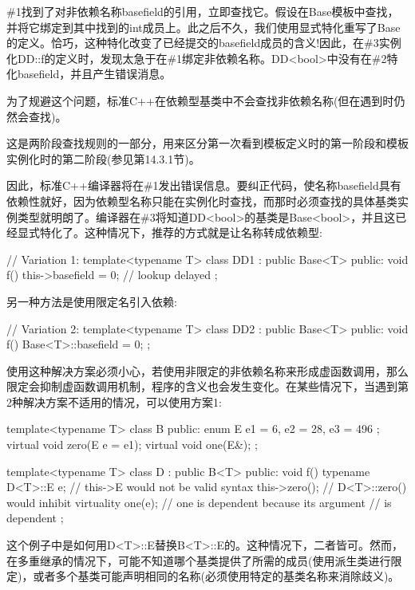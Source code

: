 \#1找到了对非依赖名称basefield的引用，立即查找它。假设在Base模板中查找，并将它绑定到其中找到的int成员上。此之后不久，我们使用显式特化重写了Base的定义。恰巧，这种特化改变了已经提交的basefield成员的含义!因此，在\#3实例化DD::f的定义时，发现太急于在\#1绑定非依赖名称。DD<bool>中没有在\#2特化basefield，并且产生错误消息。

为了规避这个问题，标准C++在依赖型基类中不会查找非依赖名称(但在遇到时仍然会查找)。

\begin{notice}这是两阶段查找规则的一部分，用来区分第一次看到模板定义时的第一阶段和模板实例化时的第二阶段(参见第14.3.1节)。
\end{notice}

因此，标准C++编译器将在\#1发出错误信息。要纠正代码，使名称basefield具有依赖性就好，因为依赖型名称只能在实例化时查找，而那时必须查找的具体基类实例类型就明朗了。编译器在\#3将知道DD<bool>的基类是Base<bool>，并且这已经显式特化了。这种情况下，推荐的方式就是让名称转成依赖型:

\begin{cpp}
// Variation 1:
template<typename T>
class DD1 : public Base<T> {
	public:
	void f() { this->basefield = 0; } // lookup delayed
};
\end{cpp}

另一种方法是使用限定名引入依赖:

\begin{cpp}
// Variation 2:
template<typename T>
class DD2 : public Base<T> {
	public:
	void f() { Base<T>::basefield = 0; }
};
\end{cpp}

使用这种解决方案必须小心，若使用非限定的非依赖名称来形成虚函数调用，那么限定会抑制虚函数调用机制，程序的含义也会发生变化。在某些情况下，当遇到第2种解决方案不适用的情况，可以使用方案1:

\begin{cpp}
template<typename T>
class B {
	public:
	enum E { e1 = 6, e2 = 28, e3 = 496 };
	virtual void zero(E e = e1);
	virtual void one(E&);
};

template<typename T>
class D : public B<T> {
	public:
	void f() {
		typename D<T>::E e; // this->E would not be valid syntax
		this->zero(); // D<T>::zero() would inhibit virtuality
		one(e); // one is dependent because its argument
	} // is dependent
};
\end{cpp}

这个例子中是如何用D<T>::E替换B<T>::E的。这种情况下，二者皆可。然而，在多重继承的情况下，可能不知道哪个基类提供了所需的成员(使用派生类进行限定)，或者多个基类可能声明相同的名称(必须使用特定的基类名称来消除歧义)。

